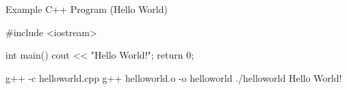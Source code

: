 \documentclass[../lecture1-introduction.tex]{subfiles}
\begin{document}
\begin{frame}[fragile]{Example C++ Program (Hello World)}
    \begin{cppcode}[]
#include <iostream>

int main()
{
    cout << "Hello World!";
    return 0;
}
    \end{cppcode}

    \begin{commandshell}
g++ -c helloworld.cpp
g++ helloworld.o -o helloworld
./helloworld
Hello World!
    \end{commandshell}
\end{frame}

\end{document}
